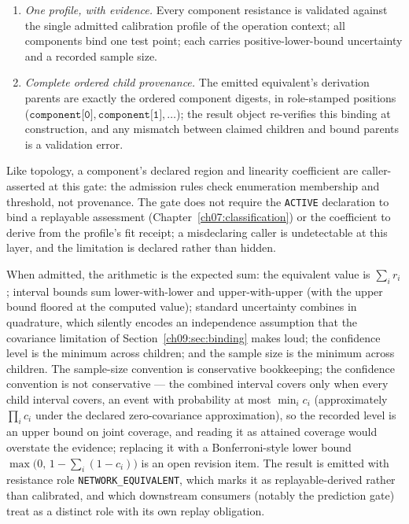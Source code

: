 \begin{ruleenv}
\begin{enumerate}
(an $R^2$ in $[0,1]$) is at or above the profile's declared minimum;
the threshold is a profile tolerance, not a constant.
\item \emph{One profile, with evidence.} Every component resistance is
validated against the single admitted calibration profile of the operation
context; all components bind one test point; each carries positive-lower-bound
uncertainty and a recorded sample size.
\item \emph{Complete ordered child provenance.} The emitted equivalent's
derivation parents are exactly the ordered component digests, in
role-stamped positions ($\texttt{component[0]}, \texttt{component[1]},
\ldots$); the result object re-verifies this binding at construction, and
any mismatch between claimed children and bound parents is a validation
error.
\end{enumerate}
\end{ruleenv}

Like topology, a component's declared region and linearity coefficient
are caller-asserted at this gate: the admission rules check enumeration
membership and threshold, not provenance. The gate does not require the
\texttt{ACTIVE} declaration to bind a replayable assessment
(Chapter~\ref{ch07:classification}) or the coefficient to derive from
the profile's fit receipt; a misdeclaring caller is undetectable at this
layer, and the limitation is declared rather than hidden.

When admitted, the arithmetic is the expected sum: the equivalent value is
$\sum_i r_i$; interval bounds sum lower-with-lower and upper-with-upper
(with the upper bound floored at the computed value); standard uncertainty
combines in quadrature, which silently encodes an independence assumption
that the covariance limitation of Section~\ref{ch09:sec:binding} makes
loud; the confidence level is the minimum across children; and the sample
size is the minimum across children. The sample-size convention is
conservative bookkeeping; the confidence convention is not conservative
--- the combined interval covers only when every child interval covers,
an event with probability at most $\min_i c_i$ (approximately
$\prod_i c_i$ under the declared zero-covariance approximation), so the
recorded level is an upper bound on joint coverage, and reading it as
attained coverage would overstate the evidence; replacing it with a
Bonferroni-style lower bound $\max\bigl(0,\,1-\sum_i(1-c_i)\bigr)$ is an
open revision item. The result is emitted with resistance role
\texttt{NETWORK\_EQUIVALENT}, which marks it as replayable-derived rather
than calibrated, and which downstream consumers (notably the prediction
gate) treat as a distinct role with its own replay obligation.

